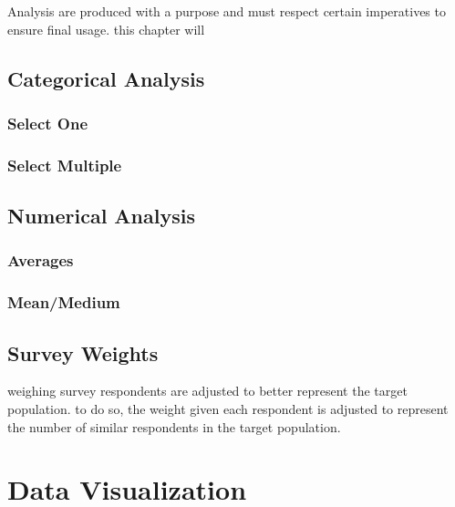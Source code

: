 \documentclass[
  letterpaper,
  DIV=11,
  numbers=noendperiod]{scrreprt}
\begin{document}
Analysis are produced with a purpose and must respect certain
imperatives to ensure final usage. this chapter will

\hypertarget{categorical-analysis}{%
\section{Categorical Analysis}\label{categorical-analysis}}

\hypertarget{select-one}{%
\subsection{Select One}\label{select-one}}

\hypertarget{select-multiple}{%
\subsection{Select Multiple}\label{select-multiple}}

\hypertarget{numerical-analysis}{%
\section{Numerical Analysis}\label{numerical-analysis}}

\hypertarget{averages}{%
\subsection{Averages}\label{averages}}

\hypertarget{meanmedium}{%
\subsection{Mean/Medium}\label{meanmedium}}

\hypertarget{survey-weights}{%
\section{Survey Weights}\label{survey-weights}}

weighing survey respondents are adjusted to better represent the target
population. to do so, the weight given each respondent is adjusted to
represent the number of similar respondents in the target population.


\hypertarget{data-visualization}{%
\chapter{Data Visualization}\label{data-visualization}}
\end{document}
